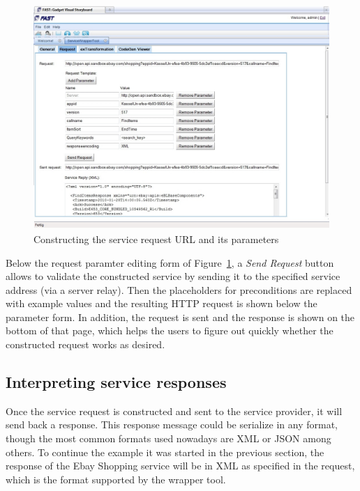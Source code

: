 \documentclass{fast_latex}
\begin{document}
\begin{figure}[!htb]
  \begin{center}
    \includegraphics[width=\linewidth]{images/ServiceWrapperToolGVSWithRequestExample.jpg}
    \caption{Constructing the service request URL and its parameters}
    \label{fig:construct_service_request}
  \end{center}
\end{figure}

Below the request paramter editing form of Figure~\ref{fig:construct_service_request}, a \textit{Send Request} button allows to validate the constructed service by sending it to the specified service address (via a server relay). Then the placeholders for preconditions are replaced with example values and the resulting HTTP request is shown below the parameter form. In addition, the request is sent and the response is shown on the bottom of that page, which helps the users to figure out quickly whether the constructed request works as desired. 


\subsection{Interpreting service responses} %
\label{sub:interpreting_service_responses}

Once the service request is constructed and sent to the service provider, it will send back a response. This response message could be serialize in any format, though the most common formats used nowadays are XML or JSON among others. To continue the example it was started in the previous section, the response of the Ebay Shopping service will be in XML as specified in the request, which is the format supported by the wrapper tool.
\end{document}
